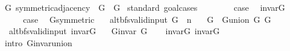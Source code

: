 \begin{isabellebody}
\isanewline
{}\isamarkupfalse%
%
\endisatagproof
{\isafoldproof}%
%
\isadelimproof
\isanewline
%
\endisadelimproof
\isanewline
{}\isamarkupfalse%
\ G{}{\isacharcolon}{\kern0pt}\ symmetric{\isacharunderscore}{\kern0pt}adjacency\ \ G\ {\isacharequal}{\kern0pt}\ G{}\isanewline
%
\isadelimproof
%
\endisadelimproof
%
\isatagproof
{}\isamarkupfalse%
\ {\isacharparenleft}{\kern0pt}standard{\isacharcomma}{\kern0pt}\ goal{\isacharunderscore}{\kern0pt}cases{\isacharparenright}{\kern0pt}\isanewline
\ \ \isamarkupfalse%
\ {}\isanewline
\ \ \isamarkupfalse%
\ {\isacharquery}{\kern0pt}case\ \isamarkupfalse%
\ invar{\isacharunderscore}{\kern0pt}G{}\ \isacommand{{\isachardot}{\kern0pt}}\isamarkupfalse%
\isanewline
{}\isamarkupfalse%
\isanewline
\ \ \isamarkupfalse%
\ {}\isanewline
\ \ \isamarkupfalse%
\ {\isacharquery}{\kern0pt}case\ \isamarkupfalse%
\ G{}{\isacharunderscore}{\kern0pt}symmetric\ \isacommand{{\isachardot}{\kern0pt}}\isamarkupfalse%
\isanewline
{}\isamarkupfalse%
%
\endisatagproof
{\isafoldproof}%
%
\isadelimproof
\isanewline
%
\endisadelimproof
\isanewline
{}\isamarkupfalse%
\isanewline
\isanewline
{}\isamarkupfalse%
\ {\isacharparenleft}{\kern0pt}\ alt{\isacharunderscore}{\kern0pt}bfs{\isacharunderscore}{\kern0pt}valid{\isacharunderscore}{\kern0pt}input{\isacharparenright}{\kern0pt}\ G\ {\isacharcolon}{\kern0pt}{\isacharcolon}{\kern0pt}\ {\isacharprime}{\kern0pt}n\ \isanewline
\ \ {\isachardoublequoteopen}G\ {\isasymequiv}\ G{\isachardot}{\kern0pt}union\ G{}\ G{}{\isachardoublequoteclose}\isanewline
\isanewline
{}\isamarkupfalse%
\ {\isacharparenleft}{\kern0pt}\ alt{\isacharunderscore}{\kern0pt}bfs{\isacharunderscore}{\kern0pt}valid{\isacharunderscore}{\kern0pt}input{\isacharparenright}{\kern0pt}\ invar{\isacharunderscore}{\kern0pt}G{\isacharcolon}{\kern0pt}\isanewline
\ \ \ {\isachardoublequoteopen}G{\isachardot}{\kern0pt}invar\ G{\isachardoublequoteclose}\isanewline
%
\isadelimproof
\ \ %
\endisadelimproof
%
\isatagproof
{}\isamarkupfalse%
\ invar{\isacharunderscore}{\kern0pt}G{}\ invar{\isacharunderscore}{\kern0pt}G{}\isanewline
\ \ \isamarkupfalse%
\ {\isacharparenleft}{\kern0pt}intro\ G{\isachardot}{\kern0pt}invar{\isacharunderscore}{\kern0pt}union{\isacharparenright}{\kern0pt}%

\end{isabellebody}
